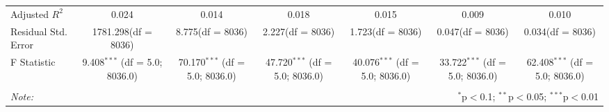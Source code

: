 \begin{table}[!htbp]
\begin{tabular}{@{\extracolsep{5pt}}lcccccc}
 Adjusted $R^2$ & 0.024 & 0.014 & 0.018 & 0.015 & 0.009 & 0.010 \\
 Residual Std. Error & 1781.298(df = 8036) & 8.775(df = 8036) & 2.227(df = 8036) & 1.723(df = 8036) & 0.047(df = 8036) & 0.034(df = 8036)  \\
 F Statistic & 9.408$^{***}$ (df = 5.0; 8036.0) & 70.170$^{***}$ (df = 5.0; 8036.0) & 47.720$^{***}$ (df = 5.0; 8036.0) & 40.076$^{***}$ (df = 5.0; 8036.0) & 33.722$^{***}$ (df = 5.0; 8036.0) & 62.408$^{***}$ (df = 5.0; 8036.0) \\
\hline
\hline \\[-1.8ex]
\textit{Note:} & \multicolumn{6}{r}{$^{*}$p$<$0.1; $^{**}$p$<$0.05; $^{***}$p$<$0.01} \\
\end{tabular}
\end{table}